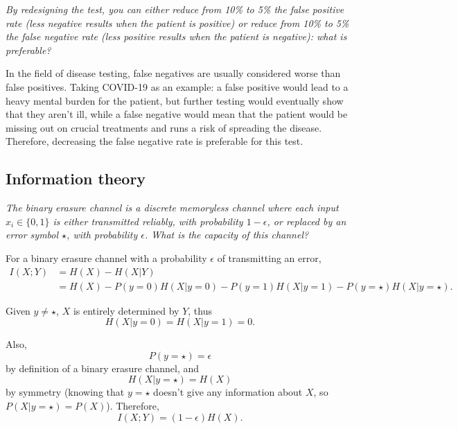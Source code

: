 \documentclass[12pt]{article}
\begin{document}
  \begin{displayquote}
    \itshape{}
    By redesigning the test, you can either reduce from 10\% to 5\% the false
    positive rate (less negative results when the patient is positive) or
    reduce from 10\% to 5\% the false negative rate (less positive results when
    the patient is negative): what is preferable?
  \end{displayquote}

  In the field of disease testing, false negatives are usually considered worse
  than false positives. Taking COVID-19 as an example: a false positive would
  lead to a heavy mental burden for the patient, but further testing would
  eventually show that they aren't ill, while a false negative would mean that
  the patient would be missing out on crucial treatments and runs a risk of
  spreading the disease. Therefore, decreasing the false negative rate is
  preferable for this test.

  \subsection{Information theory}

  \begin{displayquote}
    \itshape{}
    The binary erasure channel is a discrete memoryless channel where each
    input $x_i \in \{0, 1\}$ is either transmitted reliably, with probability
    $1-\epsilon$, or replaced by an error symbol $\star$, with probability
    $\epsilon$. What is the capacity of this channel?
  \end{displayquote}

  For a binary erasure channel with a probability $\epsilon$ of transmitting an
  error,
  \begin{equation}
    \begin{split}
      I(X; Y) &= H(X) - H(X | Y)\\
      &= H(X) - P(y = 0) H(X | y = 0) - P(y = 1) H(X | y = 1) - P(y = \star) H(X
        | y = \star).
    \end{split}
  \end{equation}

  Given $y \neq \star$, $X$ is entirely determined by $Y$, thus
  \begin{equation}
    H(X | y = 0) = H(X | y = 1) = 0.
  \end{equation}

  Also,
  \begin{equation}
    P(y = \star) = \epsilon
  \end{equation}
  by definition of a binary erasure channel, and
  \begin{equation}
    H(X |y = \star) = H(X)
  \end{equation}
  by symmetry (knowing that $y = \star$ doesn't give any information about $X$,
  so $P(X | y = \star) = P(X)$). Therefore,
  \begin{equation}
    I(X; Y) = (1 - \epsilon)H(X).
  \end{equation}
\end{document}
